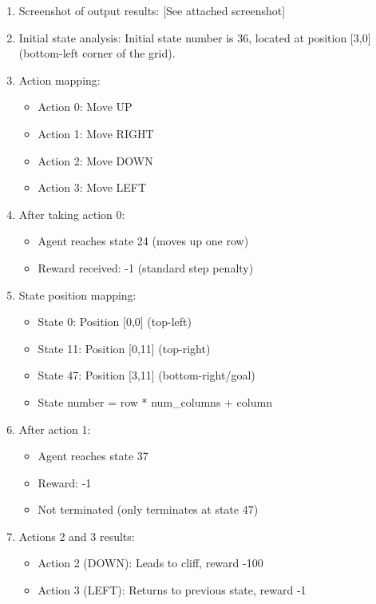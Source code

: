 \documentclass{article}
\begin{document}
\begin{enumerate}[label=(\arabic*)]
\item Screenshot of output results: [See attached screenshot]

\item Initial state analysis:
Initial state number is 36, located at position [3,0] (bottom-left corner of the grid).

\item Action mapping:
\begin{itemize}
    \item Action 0: Move UP
    \item Action 1: Move RIGHT
    \item Action 2: Move DOWN
    \item Action 3: Move LEFT
\end{itemize}

\item After taking action 0:
\begin{itemize}
    \item Agent reaches state 24 (moves up one row)
    \item Reward received: -1 (standard step penalty)
\end{itemize}

\item State position mapping:
\begin{itemize}
    \item State 0: Position [0,0] (top-left)
    \item State 11: Position [0,11] (top-right)
    \item State 47: Position [3,11] (bottom-right/goal)
    \item State number = row * num\_columns + column
\end{itemize}

\item After action 1:
\begin{itemize}
    \item Agent reaches state 37
    \item Reward: -1
    \item Not terminated (only terminates at state 47)
\end{itemize}

\item Actions 2 and 3 results:
\begin{itemize}
    \item Action 2 (DOWN): Leads to cliff, reward -100
    \item Action 3 (LEFT): Returns to previous state, reward -1
\end{itemize}


\end{enumerate}
\end{document}
